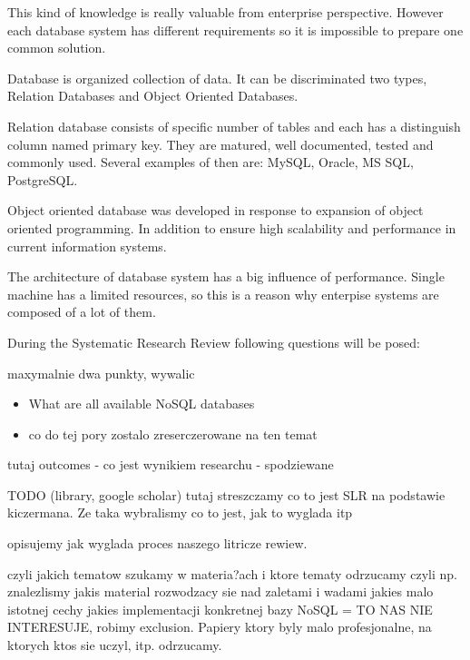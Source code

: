 \documentclass[times, 10pt,twocolumn]{article}
\begin{document}
This kind of knowledge is really valuable from enterprise perspective. However each database
system has different requirements so it is impossible to prepare one common solution.
 

Database is organized collection of data. It can be discriminated two types, 
Relation Databases and Object Oriented Databases.

Relation database consists of specific number of tables and each has a distinguish column named primary key. 
They are matured, well documented, tested and commonly used. Several examples of then are: MySQL, Oracle, MS SQL, PostgreSQL. 

Object oriented database was developed in response to expansion of object oriented programming. In addition to ensure high scalability and  
performance in current information systems.

The architecture of database system has a big influence of performance. Single machine has a limited
resources, so this is a reason why enterpise systems  are composed of a lot of them.



During the Systematic Research Review following questions will be posed: 

maxymalnie dwa punkty, wywalic

\begin{itemize}
  \item What are all available NoSQL databases
  \item co do tej pory zostalo zreserczerowane na ten temat 
\end{itemize}

tutaj outcomes - co jest wynikiem researchu - spodziewane


TODO (library, google scholar)
tutaj streszczamy co to jest SLR na podstawie kiczermana. Ze taka wybralismy
co to jest, jak to wyglada itp


opisujemy jak wyglada proces naszego litricze rewiew.


czyli jakich tematow szukamy w materia?ach
i ktore tematy odrzucamy
czyli np. znalezlismy jakis material rozwodzacy sie nad zaletami i wadami jakies malo istotnej cechy jakies implementacji konkretnej bazy NoSQL = TO NAS NIE INTERESUJE, robimy exclusion. 
Papiery ktory byly malo profesjonalne, na ktorych ktos sie uczyl, itp. odrzucamy.
\end{document}
